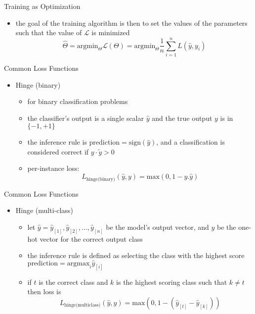 \begin{frame}{Training as Optimization}
    \begin{itemize}
        \item<1-> the goal of the training algorithm is then to set the values of the parameters such that the value of $\mathcal{L}$ is minimized
        \begin{equation*}
            \hat{\Theta} = \text{argmin}_{\Theta} \mathcal{L}(\Theta) =\text{argmin}_{\Theta} \frac{1}{n}\sum_{i=1}^{n}L(\hat{y},y_i) 
        \end{equation*}
      \end{itemize}
\end{frame}
\begin{frame}{Common Loss Functions}
    \begin{itemize}
        \item Hinge (binary)
        \begin{itemize}
            \item<1-> for binary classification problems
            \item<2-> the classifier’s output is a single scalar $\hat{y}$ and the true output $y$ is in $\{-1,+1\}$
            \item<3-> the inference rule is prediction$= \text{sign}(\hat{y})$, and a classification is considered correct if $y \cdot \tilde{y} > 0$ 
            \item<4-> per-instance loss:
            \begin{equation*}
              L_{\text{hinge(binary)}} (\hat{y}, y) = \text{max}(0, 1 - y. \hat{y}) 
            \end{equation*}
        \end{itemize}
    \end{itemize}
\end{frame}
\begin{frame}{Common Loss Functions}
    \begin{itemize}
        \item Hinge (multi-class)
        \begin{itemize}
            \item<1-> let $\hat{y} =  \hat{y}_{[1]},\hat{y}_{[2]},..., \hat{y}_{[n]} $ be the model’s output vector, and $y$ be the one-hot vector for the correct output class
            \item<2-> the inference rule is defined as selecting the class with the highest score
             $\text{prediction}= \text{argmax}_{i}\hat{y}_{[i]}$
             \item<3-> if $t$ is the correct class and $k$ is the highest scoring class such that $k \neq t$ then loss is
                \begin{equation*}
              L_{\text{hinge(multiclass)}} (\hat{y}, y) = \text{max}(0, 1- (\hat{y}_{[t]}-\hat{y}_{[k]}))
            \end{equation*}
        \end{itemize}
    \end{itemize}
\end{frame}
